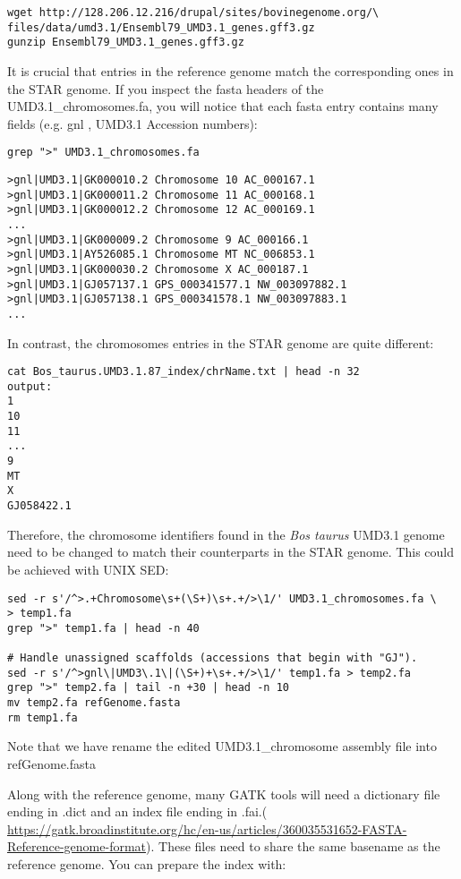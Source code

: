\begin{verbatim}
wget http://128.206.12.216/drupal/sites/bovinegenome.org/\
files/data/umd3.1/Ensembl79_UMD3.1_genes.gff3.gz
gunzip Ensembl79_UMD3.1_genes.gff3.gz
\end{verbatim}


It is crucial that entries in the reference genome match the corresponding ones in the STAR genome. If you inspect the fasta headers of the UMD3.1\_chromosomes.fa, you will notice that each fasta entry contains many fields (e.g. gnl , UMD3.1 Accession numbers):

\begin{verbatim}
grep ">" UMD3.1_chromosomes.fa
\end{verbatim}


\begin{verbatim}
>gnl|UMD3.1|GK000010.2 Chromosome 10 AC_000167.1
>gnl|UMD3.1|GK000011.2 Chromosome 11 AC_000168.1
>gnl|UMD3.1|GK000012.2 Chromosome 12 AC_000169.1
...
>gnl|UMD3.1|GK000009.2 Chromosome 9 AC_000166.1
>gnl|UMD3.1|AY526085.1 Chromosome MT NC_006853.1
>gnl|UMD3.1|GK000030.2 Chromosome X AC_000187.1
>gnl|UMD3.1|GJ057137.1 GPS_000341577.1 NW_003097882.1
>gnl|UMD3.1|GJ057138.1 GPS_000341578.1 NW_003097883.1
...
\end{verbatim}

In contrast, the chromosomes entries in the STAR genome are quite different:

\begin{verbatim}
cat Bos_taurus.UMD3.1.87_index/chrName.txt | head -n 32
output:
1
10
11
...
9
MT
X
GJ058422.1
\end{verbatim}

Therefore, the chromosome identifiers found in the \textit{Bos taurus} UMD3.1 genome need to be changed to match their counterparts in the STAR genome. This could be achieved with UNIX SED:

\begin{verbatim}
sed -r s'/^>.+Chromosome\s+(\S+)\s+.+/>\1/' UMD3.1_chromosomes.fa \
> temp1.fa
grep ">" temp1.fa | head -n 40

# Handle unassigned scaffolds (accessions that begin with "GJ").
sed -r s'/^>gnl\|UMD3\.1\|(\S+)+\s+.+/>\1/' temp1.fa > temp2.fa
grep ">" temp2.fa | tail -n +30 | head -n 10
mv temp2.fa refGenome.fasta
rm temp1.fa
\end{verbatim}

Note that we have rename the edited UMD3.1\_chromosome assembly file into refGenome.fasta

Along with the reference genome, many GATK tools will need a dictionary file ending in .dict and an index file ending in .fai.(\href{https://gatk.broadinstitute.org/hc/en-us/articles/360035531652-FASTA-Reference-genome-format}{ https://gatk.broadinstitute.org/hc/en-us/articles/360035531652-FASTA-Reference-genome-format}). These files need to share the same basename as the reference genome. You can prepare the index with:

